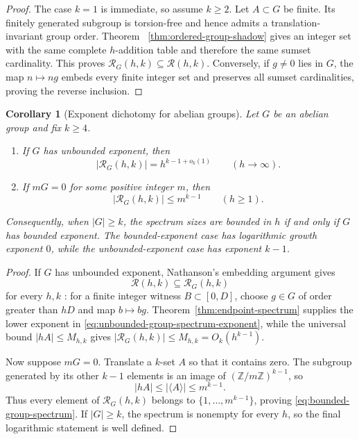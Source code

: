 \documentclass[11pt,reqno]{amsart}
\newtheorem{corollary}[theorem]{Corollary}
\theoremstyle{definition}
\theoremstyle{remark}
\newcommand{\Rcal}{\mathcal R}
\begin{document}
\begin{proof}
The case $k=1$ is immediate, so assume $k\geq2$.
Let $A\subset G$ be finite.  Its finitely generated subgroup is torsion-free
and hence admits a translation-invariant group order.  Theorem~
\ref{thm:ordered-group-shadow} gives an integer set with the same complete
$h$-addition table and therefore the same sumset cardinality.  This proves
$\Rcal_G(h,k)\subseteq\Rcal(h,k)$.  Conversely, if $g\ne0$ lies in $G$, the
map $n\mapsto ng$ embeds every finite integer set and preserves all sumset
cardinalities, proving the reverse inclusion.
\end{proof}

\begin{corollary}[Exponent dichotomy for abelian groups]
\label{cor:group-exponent-dichotomy}
Let $G$ be an abelian group and fix $k\geq4$.
\begin{enumerate}[label=\textup{(\roman*)}]
\item If $G$ has unbounded exponent, then
\begin{equation}\label{eq:unbounded-group-spectrum-exponent}
 |\Rcal_G(h,k)|=h^{k-1+o_k(1)}
 \qquad(h\to\infty).
\end{equation}
\item If $mG=0$ for some positive integer $m$, then
\begin{equation}\label{eq:bounded-group-spectrum}
 |\Rcal_G(h,k)|\leq m^{k-1}
 \qquad(h\geq1).
\end{equation}
\end{enumerate}
 Consequently, when $|G|\geq k$, the spectrum sizes are bounded in $h$ if
 and only if $G$ has bounded exponent.  The bounded-exponent case has
 logarithmic growth exponent $0$, while the unbounded-exponent case has
 exponent $k-1$.
\end{corollary}

\begin{proof}
If $G$ has unbounded exponent, Nathanson's embedding argument gives
\[
 \Rcal(h,k)\subseteq\Rcal_G(h,k)
\]
for every $h,k$ \cite[Theorem~3]{NathansonProblems}: for a finite integer
witness $B\subset[0,D]$, choose $g\in G$ of order greater than $hD$ and map
$b\mapsto bg$.  Theorem~\ref{thm:endpoint-spectrum} supplies the lower
exponent in \eqref{eq:unbounded-group-spectrum-exponent}, while the universal
bound $|hA|\leq M_{h,k}$ gives $|\Rcal_G(h,k)|\leq M_{h,k}=O_k(h^{k-1})$.

Now suppose $mG=0$.  Translate a $k$-set $A$ so that it contains zero.
The subgroup generated by its other $k-1$ elements is an image of
$(\mathbb Z/m\mathbb Z)^{k-1}$, so
\[
 |hA|\leq|\langle A\rangle|\leq m^{k-1}.
\]
Thus every element of $\Rcal_G(h,k)$ belongs to
$\{1,\ldots,m^{k-1}\}$, proving \eqref{eq:bounded-group-spectrum}.
If $|G|\geq k$, the spectrum is nonempty for every $h$, so the final
logarithmic statement is well defined.
\end{proof}
\end{document}
